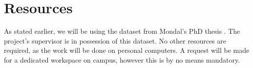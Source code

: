 \documentclass[informationsecurity]{gucmasterproject}
\begin{document}
%           

\section{Resources}
As stated earlier, we will be using the dataset from Mondal's PhD thesis \cite{mondal}. The project's supervisor is in possession of this dataset.
No other resources are required, as the work will be done on personal computers.
A request will be made for a dedicated workspace on campus, however this is by no means mandatory.
\end{document}
